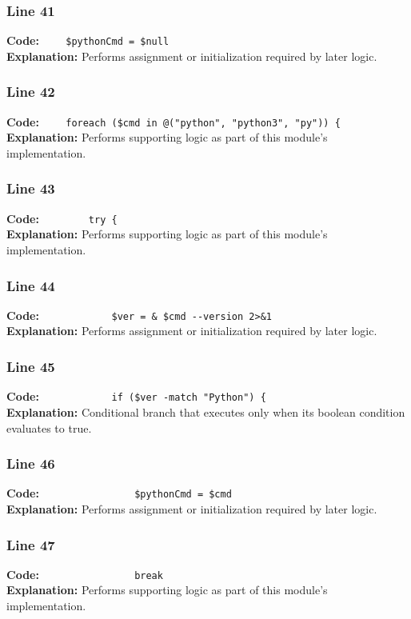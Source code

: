 \documentclass[11pt,a4paper]{article}
\begin{document}
\subsubsection*{Line 41}
\textbf{Code:} \verb|    $pythonCmd = $null|\\
\textbf{Explanation:} Performs assignment or initialization required by later logic.

\subsubsection*{Line 42}
\textbf{Code:} \verb|    foreach ($cmd in @("python", "python3", "py")) {|\\
\textbf{Explanation:} Performs supporting logic as part of this module's implementation.

\subsubsection*{Line 43}
\textbf{Code:} \verb|        try {|\\
\textbf{Explanation:} Performs supporting logic as part of this module's implementation.

\subsubsection*{Line 44}
\textbf{Code:} \verb|            $ver = & $cmd --version 2>&1|\\
\textbf{Explanation:} Performs assignment or initialization required by later logic.

\subsubsection*{Line 45}
\textbf{Code:} \verb|            if ($ver -match "Python") {|\\
\textbf{Explanation:} Conditional branch that executes only when its boolean condition evaluates to true.

\subsubsection*{Line 46}
\textbf{Code:} \verb|                $pythonCmd = $cmd|\\
\textbf{Explanation:} Performs assignment or initialization required by later logic.

\subsubsection*{Line 47}
\textbf{Code:} \verb|                break|\\
\textbf{Explanation:} Performs supporting logic as part of this module's implementation.
\end{document}
